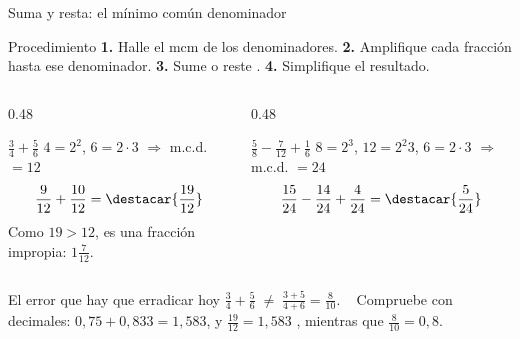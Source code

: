 \documentclass[aspectratio=169,10pt]{beamer}
\begin{document}

\begin{frame}{Suma y resta: el mínimo común denominador}
  \scriptsize
  \begin{block}{Procedimiento}
    \tiny
    \textbf{1.} Halle el mcm de los denominadores. \quad
    \textbf{2.} Amplifique cada fracción hasta ese denominador. \quad
    \textbf{3.} Sume o reste . \quad
    \textbf{4.} Simplifique el resultado.
  \end{block}

  \vspace{0.04cm}
  \begin{columns}[T,onlytextwidth]
    \begin{column}{0.48\textwidth}
      \begin{exampleblock}{$\tfrac{3}{4}+\tfrac{5}{6}$}
        \tiny
        $4=2^{2}$, $6=2\cdot 3$ $\Rightarrow$ m.c.d. $=12$
        \[ \frac{9}{12}+\frac{10}{12}
           = \destacar{\frac{19}{12}} \]
        {\color{uniGris}Como $19>12$, es una fracción impropia:
        $1\tfrac{7}{12}$.}
      \end{exampleblock}
    \end{column}
    \begin{column}{0.48\textwidth}
      \begin{exampleblock}{$\tfrac{5}{8}-\tfrac{7}{12}+\tfrac{1}{6}$}
        \tiny
        $8=2^{3}$, $12=2^{2}3$, $6=2\cdot 3$ $\Rightarrow$ m.c.d. $=24$
        \[ \frac{15}{24}-\frac{14}{24}+\frac{4}{24}
           = \destacar{\frac{5}{24}} \]
      \end{exampleblock}
    \end{column}
  \end{columns}

  \vspace{-0.02cm}
  \begin{alertblock}{El error que hay que erradicar hoy}
    \tiny
    $\tfrac{3}{4}+\tfrac{5}{6} \;\neq\; \tfrac{3+5}{4+6} = \tfrac{8}{10}$. \
     Compruebe con decimales:
    $0{,}75+0{,}833 = 1{,}583$, y $\tfrac{19}{12}=1{,}583$ \checkmark, mientras
    que $\tfrac{8}{10}=0{,}8$.
  \end{alertblock}
\end{frame}
\end{document}

